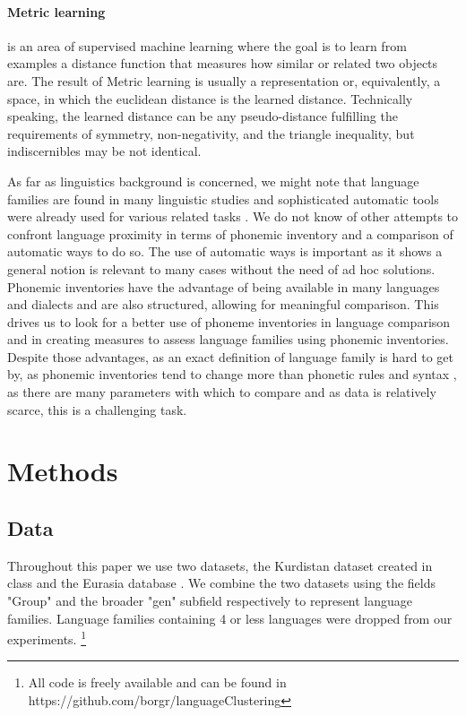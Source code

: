 \documentclass[letterpaper, 11pt]{article}
\begin{document}
\paragraph{Metric learning} is an area of supervised machine learning where the goal is to learn from examples a distance function that measures how similar or related two objects are. The result of Metric learning is usually a representation or, equivalently, a space, in which the euclidean distance is the learned distance. Technically speaking, the learned distance can be any pseudo-distance fulfilling the requirements of symmetry, non-negativity, and the triangle inequality, but indiscernibles may be not identical.

As far as linguistics background is concerned, we might note that language families are found in many linguistic studies \cite{aikhenvald1999arawak} and sophisticated automatic tools were already used for various related tasks \cite{bouckaert2012mapping}. We do not know of other attempts to confront language proximity in terms of phonemic inventory and a comparison of automatic ways to do so. The use of automatic ways is important as it shows a general notion is relevant to many cases without the need of ad hoc solutions. 
Phonemic inventories have the advantage of being available in many languages and dialects and are also structured, allowing for meaningful comparison. This drives us to look for a better use of phoneme inventories in language comparison and in creating measures to assess language families using phonemic inventories. Despite those advantages, as an exact definition of language family is hard to get by, as phonemic inventories tend to change more than phonetic rules and syntax \cite{mohammadi2comparative}, as there are many parameters with which to compare and as data is relatively scarce, this is a challenging task.

\section{Methods}
\subsection*{Data} Throughout this paper we use two datasets, the Kurdistan dataset created in class and the Eurasia database \cite{Nikolaev2015database}. We combine the two datasets using the fields "Group" and the broader "gen" subfield respectively to represent language families. Language families containing 4 or less languages were dropped from our experiments.
\footnote{All code is freely available and can be found in https://github.com/borgr/languageClustering}
\end{document}
